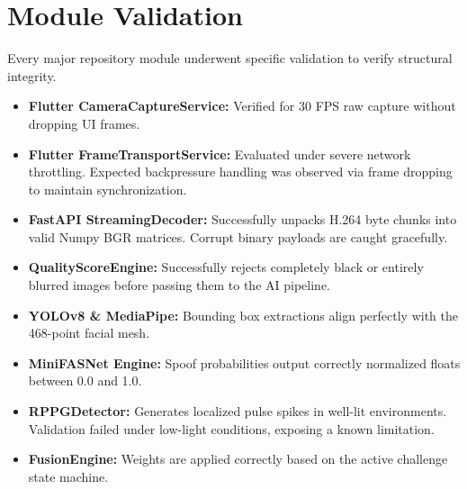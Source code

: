 \documentclass[12pt, a4paper]{report}
\begin{document}
\section{Module Validation}
Every major repository module underwent specific validation to verify structural integrity.
\begin{itemize}
    \item \textbf{Flutter CameraCaptureService:} Verified for 30 FPS raw capture without dropping UI frames.
    \item \textbf{Flutter FrameTransportService:} Evaluated under severe network throttling. Expected backpressure handling was observed via frame dropping to maintain synchronization.
    \item \textbf{FastAPI StreamingDecoder:} Successfully unpacks H.264 byte chunks into valid Numpy BGR matrices. Corrupt binary payloads are caught gracefully.
    \item \textbf{QualityScoreEngine:} Successfully rejects completely black or entirely blurred images before passing them to the AI pipeline.
    \item \textbf{YOLOv8 \& MediaPipe:} Bounding box extractions align perfectly with the 468-point facial mesh. 
    \item \textbf{MiniFASNet Engine:} Spoof probabilities output correctly normalized floats between 0.0 and 1.0.
    \item \textbf{RPPGDetector:} Generates localized pulse spikes in well-lit environments. Validation failed under low-light conditions, exposing a known limitation.
    \item \textbf{FusionEngine:} Weights are applied correctly based on the active challenge state machine.
\end{itemize}
\end{document}
